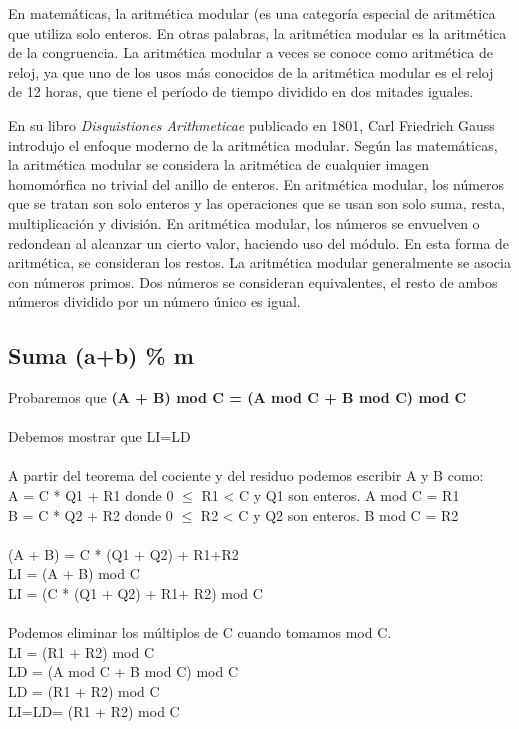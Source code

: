 En matemáticas, la aritmética modular (es una categoría especial de aritmética que utiliza solo enteros. En otras palabras, la aritmética modular es la aritmética de la congruencia. La aritmética modular a veces se conoce como aritmética de reloj, ya que uno de los usos más conocidos de la aritmética modular es el reloj de 12 horas, que tiene el período de tiempo dividido en dos mitades iguales.

En su libro \emph{Disquistiones Arithmeticae} publicado en 1801, Carl Friedrich Gauss introdujo el enfoque moderno de la aritmética modular. Según las matemáticas, la aritmética modular se considera la aritmética de cualquier imagen homomórfica no trivial del anillo de enteros. En aritmética modular, los números que se tratan son solo enteros y las operaciones que se usan son solo suma, resta, multiplicación y división. En aritmética modular, los números se envuelven o redondean al alcanzar un cierto valor, haciendo uso del módulo. En esta forma de aritmética, se consideran los restos. La aritmética modular generalmente se asocia con números primos. Dos números se consideran equivalentes, el resto de ambos números dividido por un número único es igual.

\subsection{Suma (a+b) \% m}
Probaremos que\textbf{ (A + B) mod C = (A mod C + B mod C) mod C}\\
\\
Debemos mostrar que LI=LD\\
\\
A partir del teorema del cociente y del residuo podemos escribir A y B como:\\
A = C * Q1 + R1 donde 0 $\leq$ R1 < C y Q1 son enteros. A mod C = R1\\
B = C * Q2 + R2 donde 0  $\leq$ R2 < C y Q2 son enteros. B mod C = R2\\
\\
(A + B) = C * (Q1 + Q2) + R1+R2\\
LI = (A + B) mod C\\
LI = (C * (Q1 + Q2) + R1+ R2) mod C\\
\\
Podemos eliminar los múltiplos de C cuando tomamos mod C.\\
LI = (R1 + R2) mod C\\
LD = (A mod C + B mod C) mod C\\
LD = (R1 + R2) mod C\\
LI=LD= (R1 + R2) mod C\\

